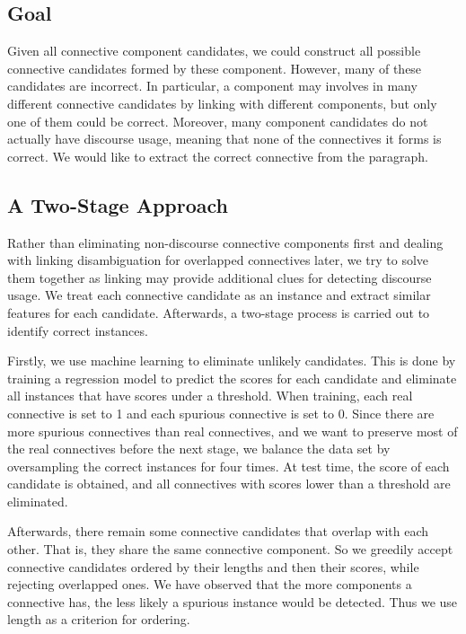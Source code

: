 \subsection{Goal}

Given all connective component candidates, we could construct all possible
connective candidates formed by these component. However, many of these
candidates are incorrect. In particular, a component may involves in
many different connective candidates by linking with different components,
but only one of them could be correct. Moreover, many component candidates
do not actually have discourse usage, meaning that none of the connectives
it forms is correct. We would like to extract the correct connective from
the paragraph.


\subsection{A Two-Stage Approach}

Rather than eliminating non-discourse connective components first and
dealing with linking disambiguation for overlapped connectives later,
we try to solve them together as linking may provide additional clues for
detecting discourse usage. We treat each connective candidate as an instance
and extract similar features for each candidate. Afterwards, a two-stage
process is carried out to identify correct instances.

Firstly, we use machine learning to eliminate unlikely candidates. This is done by
training a regression model to predict the scores for each candidate and eliminate
all instances that have scores under a threshold. When training, each real connective
is set to 1 and each spurious connective is set to 0. Since there are more spurious
connectives than real connectives, and we want to preserve most of the real connectives before
the next stage, we balance the data set by oversampling the correct instances for four times.  
At test time, the score of each candidate is obtained, and all
connectives with scores lower than a threshold are eliminated.

Afterwards, there remain some connective candidates that overlap with each other. That is,
they share the same connective component. So we greedily accept connective candidates
ordered by their lengths and then their scores, while rejecting overlapped ones. We have observed
that the more components a connective has, the less likely a spurious instance would be
detected. Thus we use length as a criterion for ordering.

